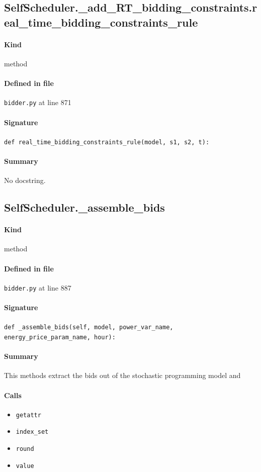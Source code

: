 \documentclass[11pt]{report}
\begin{document}
\subsection{SelfScheduler.\_add\_RT\_bidding\_constraints.real\_time\_bidding\_constraints\_rule}
\label{def:bidder.py:SelfScheduler._add_RT_bidding_constraints.real_time_bidding_constraints_rule:L871}
\paragraph{Kind} method
\paragraph{Defined in file} \texttt{bidder.py} at line 871
\paragraph{Signature} \texttt{def real\_time\_bidding\_constraints\_rule(model, s1, s2, t):}
\paragraph{Summary} No docstring.
\subsection{SelfScheduler.\_assemble\_bids}
\label{def:bidder.py:SelfScheduler._assemble_bids:L887}
\paragraph{Kind} method
\paragraph{Defined in file} \texttt{bidder.py} at line 887
\paragraph{Signature} \texttt{def \_assemble\_bids(self, model, power\_var\_name, energy\_price\_param\_name, hour):}
\paragraph{Summary} This methods extract the bids out of the stochastic programming model and
\paragraph{Calls}
\begin{itemize}[leftmargin=*]
  \item \texttt{getattr}
  \item \texttt{index\_set}
  \item \texttt{round}
  \item \texttt{value}
\end{itemize}
\end{document}
